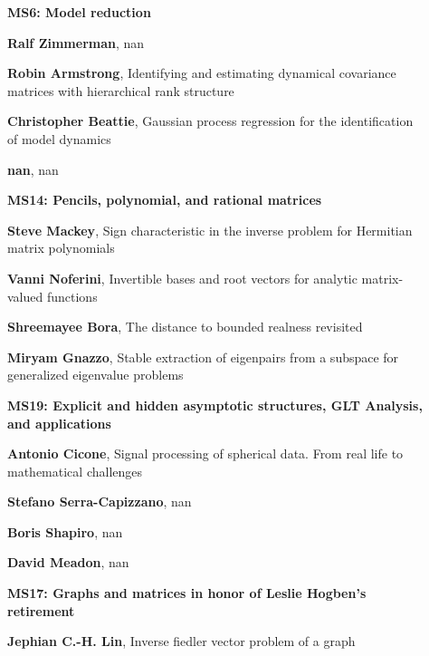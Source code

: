 \documentclass[ILAS2025-program.tex]{subfiles}
\begin{document}
\begin{description}
\begin{description}
    \item[] {\color{mstitle}\textbf{MS6: Model reduction}} 
    \item[] \textbf{Ralf Zimmerman}, nan
        \item[] \textbf{Robin Armstrong}, Identifying and estimating dynamical covariance matrices with hierarchical rank structure
        \item[] \textbf{Christopher Beattie}, Gaussian process regression for the identification of model dynamics
        \item[] \textbf{nan}, nan
        \end{description}
    \begin{description}
    \item[] {\color{mstitle}\textbf{MS14: Pencils, polynomial, and rational matrices}} 
    \item[] \textbf{Steve Mackey}, Sign characteristic in the inverse problem for Hermitian matrix polynomials
        \item[] \textbf{Vanni Noferini}, Invertible bases and root vectors for analytic matrix-valued functions
        \item[] \textbf{Shreemayee Bora}, The distance to bounded realness revisited
        \item[] \textbf{Miryam Gnazzo}, Stable extraction of eigenpairs from a subspace for generalized eigenvalue problems
        \end{description}
    \begin{description}
    \item[] {\color{mstitle}\textbf{MS19: Explicit and hidden asymptotic structures, GLT Analysis, and applications}} 
    \item[] \textbf{Antonio Cicone}, Signal processing of spherical data. From real life to mathematical challenges
        \item[] \textbf{Stefano Serra-Capizzano}, nan
        \item[] \textbf{Boris Shapiro}, nan
        \item[] \textbf{David Meadon}, nan
        \end{description}
    \begin{description}
    \item[] {\color{mstitle}\textbf{MS17: Graphs and matrices in honor of Leslie Hogben's retirement}} 
    \item[] \textbf{Jephian C.-H. Lin}, Inverse fiedler vector problem of a graph


\end{description}
\end{description}
\end{document}
